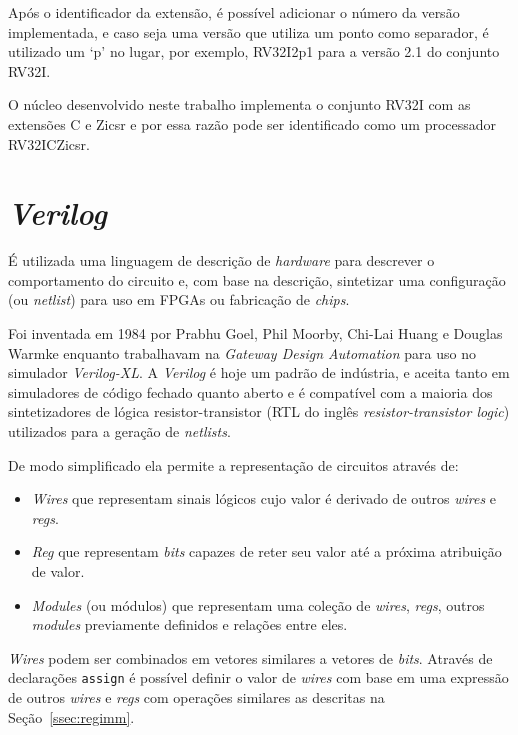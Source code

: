   Após o identificador da extensão, é possível adicionar o número da versão implementada, 
  e caso seja uma versão que utiliza um ponto como separador, 
  é utilizado um `p' no lugar, por exemplo, RV32I2p1 para a versão 2.1
  do conjunto RV32I.

  O núcleo desenvolvido neste trabalho implementa o conjunto RV32I com as extensões C e Zicsr
  e por essa razão pode ser identificado como um processador RV32ICZicsr.

\newpage

\section{\emph{Verilog}}
\label{sec:Verilog}

É utilizada uma linguagem de descrição
de \emph{hardware} para descrever o comportamento do circuito e, com base na descrição, sintetizar
uma configuração (ou \emph{netlist}) para uso em FPGAs ou fabricação de \emph{chips}.

Foi inventada em 1984 por Prabhu Goel, Phil Moorby, Chi-Lai Huang e Douglas Warmke \citep{VEEH}
enquanto trabalhavam na \emph{Gateway Design Automation} para uso no simulador \emph{Verilog-XL}.
A \emph{Verilog} é hoje um padrão de indústria, e aceita tanto em simuladores de código fechado quanto
aberto e é compatível com a maioria dos sintetizadores de lógica resistor-transistor (RTL do inglês
\emph{resistor-transistor logic}) utilizados para a geração de \emph{netlists}.

De modo simplificado ela permite a representação de circuitos através de:
\begin{itemize}
  \item \emph{Wires} que representam sinais lógicos cujo valor é derivado de outros \emph{wires} e \emph{regs}.
  \item \emph{Reg} que representam \emph{bits} capazes de reter seu valor até a próxima atribuição de valor.
  \item \emph{Modules} (ou módulos) que representam uma coleção de \emph{wires}, \emph{regs}, outros \emph{modules} 
        previamente definidos e relações entre eles.
\end{itemize}

\emph{Wires} podem ser combinados em vetores similares a vetores de \emph{bits}.
Através de declarações \texttt{assign} é possível definir o valor de \emph{wires} com base em uma expressão 
de outros \emph{wires} e \emph{regs} com operações similares as descritas na Seção~\ref{ssec:regimm}.

